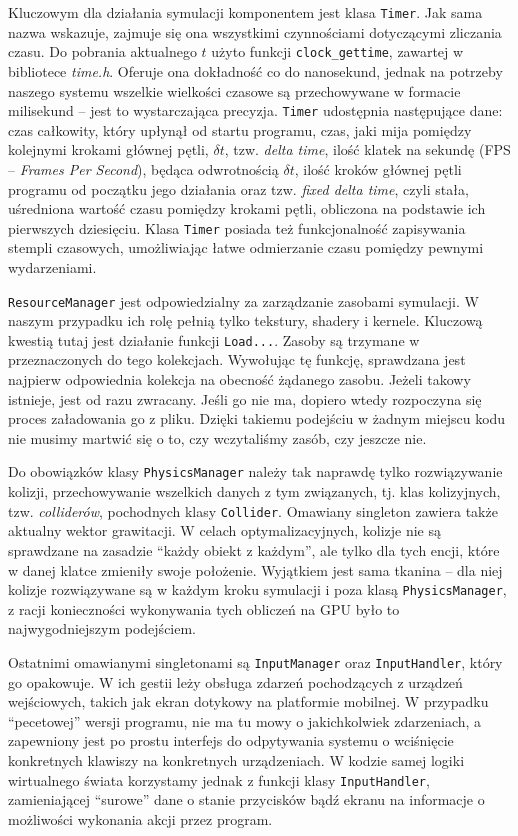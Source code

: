 	Kluczowym dla działania symulacji komponentem jest klasa \texttt{Timer}. Jak sama nazwa wskazuje, zajmuje się ona wszystkimi czynnościami dotyczącymi zliczania czasu. Do pobrania aktualnego \(t\) użyto funkcji \texttt{clock\_gettime}, zawartej w bibliotece \emph{time.h}. Oferuje ona dokładność co do nanosekund, jednak na potrzeby naszego systemu wszelkie wielkości czasowe są przechowywane w formacie milisekund -- jest to wystarczająca precyzja. \texttt{Timer} udostępnia następujące dane: czas całkowity, który upłynął od startu programu, czas, jaki mija pomiędzy kolejnymi krokami głównej pętli, \(\delta t \), tzw. \emph{delta time}, ilość klatek na sekundę (FPS -- \emph{Frames Per Second}), będąca odwrotnością \(\delta t \), ilość kroków głównej pętli programu od początku jego działania oraz tzw. \emph{fixed delta time}, czyli stała, uśredniona wartość czasu pomiędzy krokami pętli, obliczona na podstawie ich pierwszych dziesięciu. Klasa \texttt{Timer} posiada też funkcjonalność zapisywania stempli czasowych, umożliwiając łatwe odmierzanie czasu pomiędzy pewnymi wydarzeniami.
	
	\texttt{ResourceManager} jest odpowiedzialny za zarządzanie zasobami symulacji. W naszym przypadku ich rolę pełnią tylko tekstury, shadery i kernele. Kluczową kwestią tutaj jest działanie funkcji \texttt{Load...}. Zasoby są trzymane w przeznaczonych do tego kolekcjach. Wywołując tę funkcję, sprawdzana jest najpierw odpowiednia kolekcja na obecność żądanego zasobu. Jeżeli takowy istnieje, jest od razu zwracany. Jeśli go nie ma, dopiero wtedy rozpoczyna się proces załadowania go z pliku. Dzięki takiemu podejściu w żadnym miejscu kodu nie musimy martwić się o to, czy wczytaliśmy zasób, czy jeszcze nie.
	
	Do obowiązków klasy \texttt{PhysicsManager} należy tak naprawdę tylko rozwiązywanie kolizji, przechowywanie wszelkich danych z tym związanych, tj. klas kolizyjnych, tzw. \emph{colliderów}, pochodnych klasy \texttt{Collider}. Omawiany singleton zawiera także aktualny wektor grawitacji. W celach optymalizacyjnych, kolizje nie są sprawdzane na zasadzie ``każdy obiekt z każdym'', ale tylko dla tych encji, które w danej klatce zmieniły swoje położenie. Wyjątkiem jest sama tkanina -- dla niej kolizje rozwiązywane są w każdym kroku symulacji i poza klasą \texttt{PhysicsManager}, z racji konieczności wykonywania tych obliczeń na GPU było to najwygodniejszym podejściem.
	
	Ostatnimi omawianymi singletonami są \texttt{InputManager} oraz \texttt{InputHandler}, który go opakowuje. W ich gestii leży obsługa zdarzeń pochodzących z urządzeń wejściowych, takich jak ekran dotykowy na platformie mobilnej. W przypadku ``pecetowej'' wersji programu, nie ma tu mowy o jakichkolwiek zdarzeniach, a zapewniony jest po prostu interfejs do odpytywania systemu o wciśnięcie konkretnych klawiszy na konkretnych urządzeniach. W kodzie samej logiki wirtualnego świata korzystamy jednak z funkcji klasy \texttt{InputHandler}, zamieniającej ``surowe'' dane o stanie przycisków bądź ekranu na informacje o możliwości wykonania akcji przez program.
	
